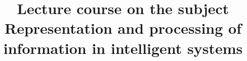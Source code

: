 \documentclass{beamer}
\begin{document}
\title{Lecture course on the subject\\ Representation and processing of information in intelligent systems}

\begin{frame}
    \titlepage
\end{frame}


% 
%
%
%
%
%
%


%

%

%

%

%

\end{document}
